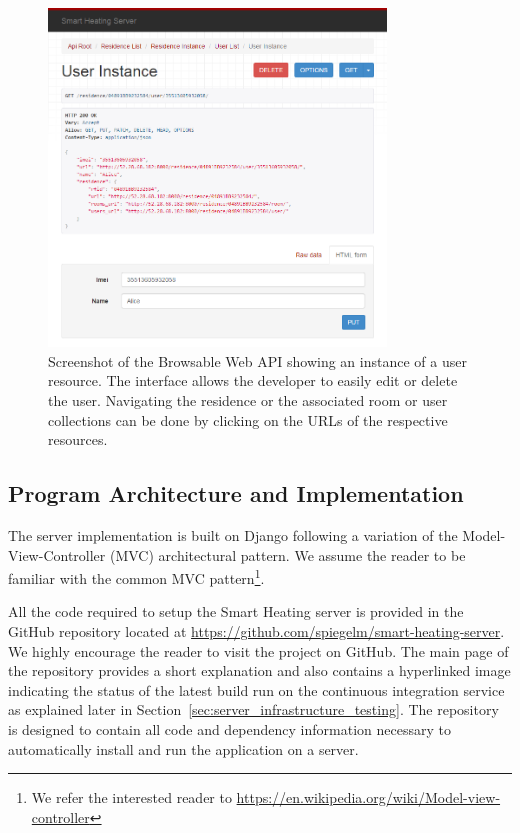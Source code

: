 \begin{figure}[h]
	\begin{center}
		\includegraphics[width=0.8\textwidth]{images/server_browable_api_user_instance.png}
	\end{center}
	\caption{Screenshot of the Browsable Web API showing an instance of a user resource. The interface allows the developer to easily edit or delete the user. Navigating the residence or the associated room or user collections can be done by clicking on the URLs of the respective resources.}
	\label{fig:server_infrastructure_browsable_api}
\end{figure}


\subsection{Program Architecture and Implementation}

The server implementation is built on Django following a variation
of the Model-View-Controller (MVC) architectural pattern.
We assume the reader to be familiar with the common MVC pattern\footnote{We refer the interested reader to \url{https://en.wikipedia.org/wiki/Model-view-controller}}.

All the code required to setup the Smart Heating server is provided in the GitHub repository located at \url{https://github.com/spiegelm/smart-heating-server}.
We highly encourage the reader to visit the project on GitHub.
The main page of the repository provides a short explanation and also contains a hyperlinked image indicating the status of the latest build run on the continuous integration service as explained later in Section~\ref{sec:server_infrastructure_testing}.
The repository is designed to contain all code and dependency information necessary to automatically install and run the application on a server.

